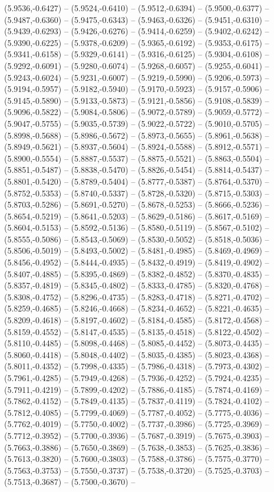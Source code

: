 (5.9536,-0.6427) -- (5.9524,-0.6410) -- (5.9512,-0.6394) -- (5.9500,-0.6377) -- (5.9487,-0.6360) -- (5.9475,-0.6343) -- (5.9463,-0.6326) -- (5.9451,-0.6310) -- (5.9439,-0.6293) -- (5.9426,-0.6276) -- (5.9414,-0.6259) -- (5.9402,-0.6242) -- (5.9390,-0.6225) -- (5.9378,-0.6209) -- (5.9365,-0.6192) -- (5.9353,-0.6175) -- (5.9341,-0.6158) -- (5.9329,-0.6141) -- (5.9316,-0.6125) -- (5.9304,-0.6108) -- (5.9292,-0.6091) -- (5.9280,-0.6074) -- (5.9268,-0.6057) -- (5.9255,-0.6041) -- (5.9243,-0.6024) -- (5.9231,-0.6007) -- (5.9219,-0.5990) -- (5.9206,-0.5973) -- (5.9194,-0.5957) -- (5.9182,-0.5940) -- (5.9170,-0.5923) -- (5.9157,-0.5906) -- (5.9145,-0.5890) -- (5.9133,-0.5873) -- (5.9121,-0.5856) -- (5.9108,-0.5839) -- (5.9096,-0.5822) -- (5.9084,-0.5806) -- (5.9072,-0.5789) -- (5.9059,-0.5772) -- (5.9047,-0.5755) -- (5.9035,-0.5739) -- (5.9022,-0.5722) -- (5.9010,-0.5705) -- (5.8998,-0.5688) -- (5.8986,-0.5672) -- (5.8973,-0.5655) -- (5.8961,-0.5638) -- (5.8949,-0.5621) -- (5.8937,-0.5604) -- (5.8924,-0.5588) -- (5.8912,-0.5571) -- (5.8900,-0.5554) -- (5.8887,-0.5537) -- (5.8875,-0.5521) -- (5.8863,-0.5504) -- (5.8851,-0.5487) -- (5.8838,-0.5470) -- (5.8826,-0.5454) -- (5.8814,-0.5437) -- (5.8801,-0.5420) -- (5.8789,-0.5404) -- (5.8777,-0.5387) -- (5.8764,-0.5370) -- (5.8752,-0.5353) -- (5.8740,-0.5337) -- (5.8728,-0.5320) -- (5.8715,-0.5303) -- (5.8703,-0.5286) -- (5.8691,-0.5270) -- (5.8678,-0.5253) -- (5.8666,-0.5236) -- (5.8654,-0.5219) -- (5.8641,-0.5203) -- (5.8629,-0.5186) -- (5.8617,-0.5169) -- (5.8604,-0.5153) -- (5.8592,-0.5136) -- (5.8580,-0.5119) -- (5.8567,-0.5102) -- (5.8555,-0.5086) -- (5.8543,-0.5069) -- (5.8530,-0.5052) -- (5.8518,-0.5036) -- (5.8506,-0.5019) -- (5.8493,-0.5002) -- (5.8481,-0.4985) -- (5.8469,-0.4969) -- (5.8456,-0.4952) -- (5.8444,-0.4935) -- (5.8432,-0.4919) -- (5.8419,-0.4902) -- (5.8407,-0.4885) -- (5.8395,-0.4869) -- (5.8382,-0.4852) -- (5.8370,-0.4835) -- (5.8357,-0.4819) -- (5.8345,-0.4802) -- (5.8333,-0.4785) -- (5.8320,-0.4768) -- (5.8308,-0.4752) -- (5.8296,-0.4735) -- (5.8283,-0.4718) -- (5.8271,-0.4702) -- (5.8259,-0.4685) -- (5.8246,-0.4668) -- (5.8234,-0.4652) -- (5.8221,-0.4635) -- (5.8209,-0.4618) -- (5.8197,-0.4602) -- (5.8184,-0.4585) -- (5.8172,-0.4568) -- (5.8159,-0.4552) -- (5.8147,-0.4535) -- (5.8135,-0.4518) -- (5.8122,-0.4502) -- (5.8110,-0.4485) -- (5.8098,-0.4468) -- (5.8085,-0.4452) -- (5.8073,-0.4435) -- (5.8060,-0.4418) -- (5.8048,-0.4402) -- (5.8035,-0.4385) -- (5.8023,-0.4368) -- (5.8011,-0.4352) -- (5.7998,-0.4335) -- (5.7986,-0.4318) -- (5.7973,-0.4302) -- (5.7961,-0.4285) -- (5.7949,-0.4268) -- (5.7936,-0.4252) -- (5.7924,-0.4235) -- (5.7911,-0.4219) -- (5.7899,-0.4202) -- (5.7886,-0.4185) -- (5.7874,-0.4169) -- (5.7862,-0.4152) -- (5.7849,-0.4135) -- (5.7837,-0.4119) -- (5.7824,-0.4102) -- (5.7812,-0.4085) -- (5.7799,-0.4069) -- (5.7787,-0.4052) -- (5.7775,-0.4036) -- (5.7762,-0.4019) -- (5.7750,-0.4002) -- (5.7737,-0.3986) -- (5.7725,-0.3969) -- (5.7712,-0.3952) -- (5.7700,-0.3936) -- (5.7687,-0.3919) -- (5.7675,-0.3903) -- (5.7663,-0.3886) -- (5.7650,-0.3869) -- (5.7638,-0.3853) -- (5.7625,-0.3836) -- (5.7613,-0.3820) -- (5.7600,-0.3803) -- (5.7588,-0.3786) -- (5.7575,-0.3770) -- (5.7563,-0.3753) -- (5.7550,-0.3737) -- (5.7538,-0.3720) -- (5.7525,-0.3703) -- (5.7513,-0.3687) -- (5.7500,-0.3670) -- 